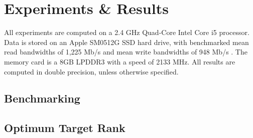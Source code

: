\chapter{Experiments \& Results}\label{chpt:3}
All experiments are computed on a 2.4 GHz Quad-Core Intel Core i5 processor.
Data is stored on an Apple SM0512G SSD hard drive, with benchmarked mean read bandwidths
of 1,225 Mb/s and mean write bandwidths of 948 Mb/s \cite{ssd_benchmark}. The memory
card is a 8GB LPDDR3 with a speed of 2133 MHz. All results are computed
in double precision, unless otherwise specified.

\section{Benchmarking}\label{sec:3_1_benchmarking}


\section{Optimum Target Rank}\label{sec:3_2_svd_params}
